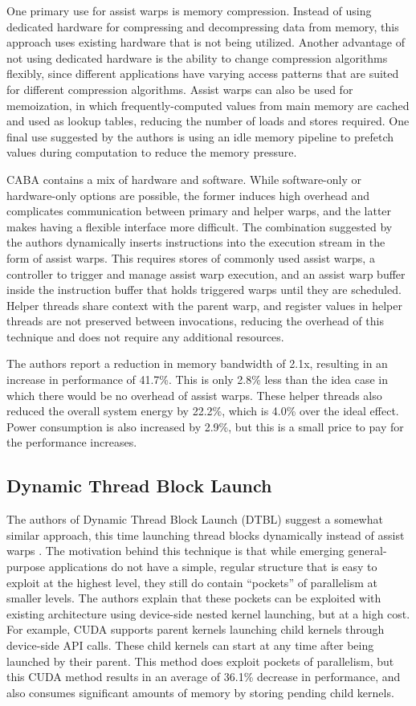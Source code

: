 \documentclass[prodmode,acmtecs]{acmsmall} %
\begin{document}
One primary use for assist warps is memory compression. Instead of using
dedicated hardware for compressing and decompressing data from memory, this
approach uses existing hardware that is not being utilized. Another advantage of
not using dedicated hardware is the ability to change compression algorithms
flexibly, since different applications have varying access patterns that are
suited for different compression algorithms. Assist warps can also be used for
memoization, in which frequently-computed values from main memory are cached and
used as lookup tables, reducing the number of loads and stores required. One
final use suggested by the authors is using an idle memory pipeline to prefetch
values during computation to reduce the memory pressure.

CABA contains a mix of hardware and software. While software-only or
hardware-only options are possible, the former induces high overhead and
complicates communication between primary and helper warps, and the latter makes
having a flexible interface more difficult. The combination suggested by the
authors dynamically inserts instructions into the execution stream in the form
of assist warps. This requires stores of commonly used assist warps, a
controller to trigger and manage assist warp execution, and an assist warp
buffer inside the instruction buffer that holds triggered warps until they are
scheduled. Helper threads share context with the parent warp, and register
values in helper threads are not preserved between invocations, reducing the
overhead of this technique and does not require any additional resources.

The authors report a reduction in memory bandwidth of 2.1x, resulting in an
increase in performance of 41.7\%. This is only 2.8\% less than the idea case in
which there would be no overhead of assist warps. These helper threads also
reduced the overall system energy by 22.2\%, which is 4.0\% over the ideal
effect. Power consumption is also increased by 2.9\%, but this is a small price
to pay for the performance increases.

\subsection{Dynamic Thread Block Launch}
The authors of Dynamic Thread Block Launch (DTBL) suggest a somewhat similar
approach, this time launching thread blocks dynamically instead of assist warps
\cite{DynamicThreadBlockLaunch}. The motivation behind this technique is that
while emerging general-purpose applications do not have a simple, regular
structure that is easy to exploit at the highest level, they still do contain
``pockets'' of parallelism at smaller levels. The authors explain that these
pockets can be exploited with existing architecture using device-side nested
kernel launching, but at a high cost. For example, CUDA supports parent kernels
launching child kernels through device-side API calls. These child kernels can
start at any time after being launched by their parent. This method does exploit
pockets of parallelism, but this CUDA method results in an average of 36.1\%
decrease in performance, and also consumes significant amounts of memory by
storing pending child kernels.
\end{document}
